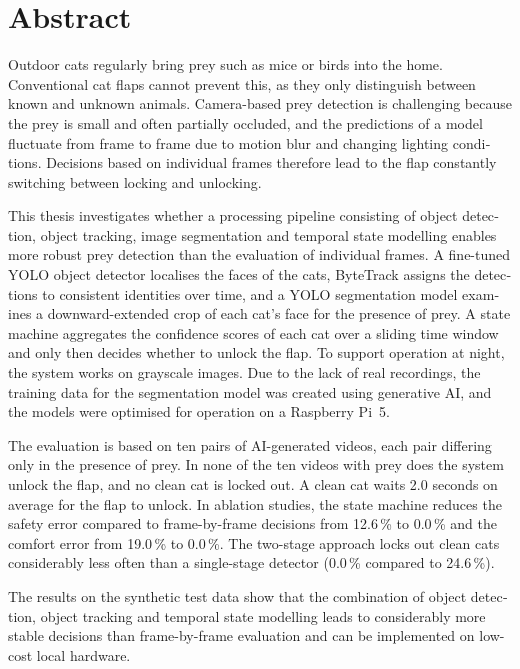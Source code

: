 \chapter{Abstract}

\begin{english} %
Outdoor cats regularly bring prey such as mice or birds into the home. Conventional cat flaps cannot prevent this, as they only distinguish between known and unknown animals. Camera-based prey detection is challenging because the prey is small and often partially occluded, and the predictions of a model fluctuate from frame to frame due to motion blur and changing lighting conditions. Decisions based on individual frames therefore lead to the flap constantly switching between locking and unlocking.

This thesis investigates whether a processing pipeline consisting of object detection, object tracking, image segmentation and temporal state modelling enables more robust prey detection than the evaluation of individual frames. A fine-tuned YOLO object detector localises the faces of the cats, ByteTrack assigns the detections to consistent identities over time, and a YOLO segmentation model examines a downward-extended crop of each cat's face for the presence of prey. A state machine aggregates the confidence scores of each cat over a sliding time window and only then decides whether to unlock the flap. To support operation at night, the system works on grayscale images. Due to the lack of real recordings, the training data for the segmentation model was created using generative AI, and the models were optimised for operation on a Raspberry Pi~5.

The evaluation is based on ten pairs of AI-generated videos, each pair differing only in the presence of prey. In none of the ten videos with prey does the system unlock the flap, and no clean cat is locked out. A clean cat waits 2.0 seconds on average for the flap to unlock. In ablation studies, the state machine reduces the safety error compared to frame-by-frame decisions from 12.6\,\% to 0.0\,\% and the comfort error from 19.0\,\% to 0.0\,\%. The two-stage approach locks out clean cats considerably less often than a single-stage detector (0.0\,\% compared to 24.6\,\%).

The results on the synthetic test data show that the combination of object detection, object tracking and temporal state modelling leads to considerably more stable decisions than frame-by-frame evaluation and can be implemented on low-cost local hardware.
\end{english}
